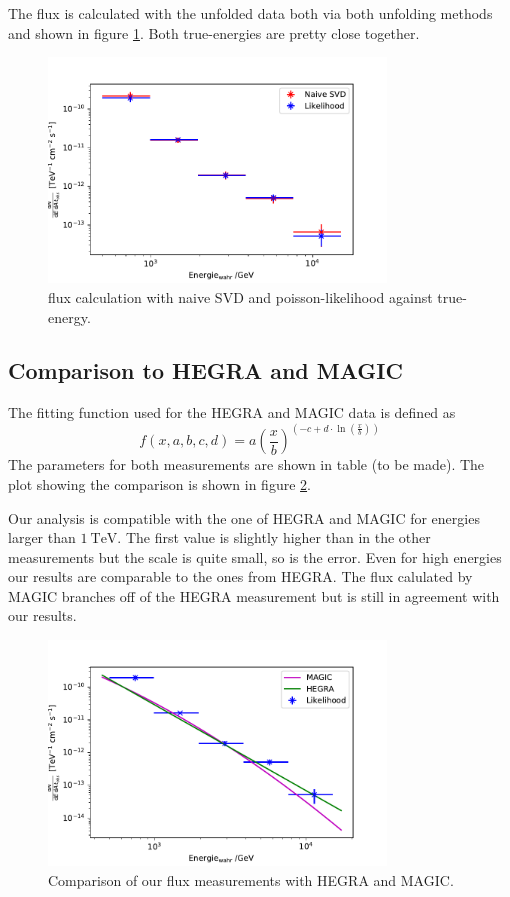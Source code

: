 The flux is calculated with the unfolded data both via both unfolding methods and shown in figure \ref{fig:fluxBoth}.
Both true-energies are pretty close together.

\begin{figure}
  \centering
  \includegraphics[width=0.8\textwidth]{plots/Fluss.pdf}
  \caption{flux calculation with naive SVD and poisson-likelihood against true-energy.}
  \label{fig:fluxBoth}
\end{figure}

\subsection{Comparison to HEGRA and MAGIC}
The fitting function used for the HEGRA and MAGIC data is defined as
\begin{equation}
  f(x, a, b, c, d) = a \left(\frac{x}{b}\right)^{\left(-c + d\cdot \ln\left(\frac{x}{b}\right)\right)}
\end{equation}
The parameters for both measurements are shown in table (to be made). The plot showing the comparison is shown in figure \ref{fig:fluxComp}.

Our analysis is compatible with the one of HEGRA and MAGIC for energies larger than $\SI{1}{\tera\electronvolt}$. The first value is slightly higher than in the other measurements but the scale is quite small, so is the error. Even for high energies our results are comparable to the ones from HEGRA. The flux calulated by MAGIC branches off of the HEGRA measurement but is still in agreement with our results.

\begin{figure}
  \centering
  \includegraphics[width=0.8\textwidth]{plots/Fluss_like.pdf}
  \caption{Comparison of our flux measurements with HEGRA and MAGIC.}
  \label{fig:fluxComp}
\end{figure}
